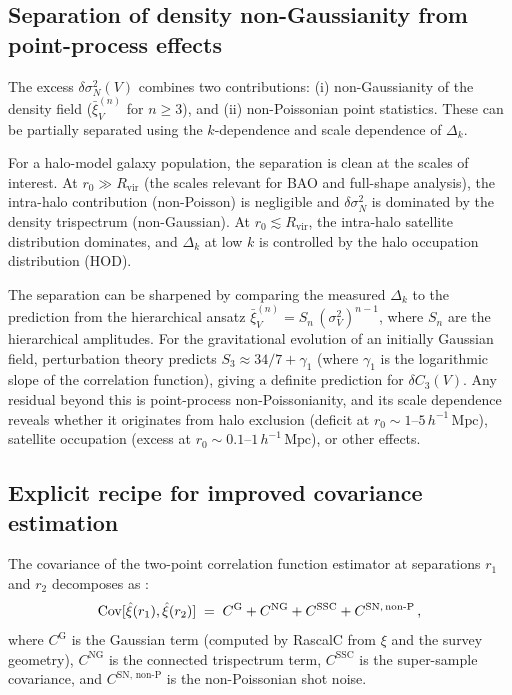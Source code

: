 \subsection{Separation of density non-Gaussianity from point-process effects}
\label{sec:separation}

The excess $\delta\sigma^2_N(V)$ combines two contributions: (i) non-Gaussianity of the density field ($\bar{\xi}^{(n)}_V$ for $n \geq 3$), and (ii) non-Poissonian point statistics.  These can be partially separated using the $k$-dependence and scale dependence of $\Delta_k$.

For a halo-model galaxy population, the separation is clean at the scales of interest.  At $r_0 \gg R_{\mathrm{vir}}$ (the scales relevant for BAO and full-shape analysis), the intra-halo contribution (non-Poisson) is negligible and $\delta\sigma^2_N$ is dominated by the density trispectrum (non-Gaussian).  At $r_0 \lesssim R_{\mathrm{vir}}$, the intra-halo satellite distribution dominates, and $\Delta_k$ at low $k$ is controlled by the halo occupation distribution (HOD).

The separation can be sharpened by comparing the measured $\Delta_k$ to the prediction from the hierarchical ansatz $\bar{\xi}^{(n)}_V = S_n\,(\sigma_V^2)^{n-1}$, where $S_n$ are the hierarchical amplitudes.  For the gravitational evolution of an initially Gaussian field, perturbation theory predicts $S_3 \approx 34/7 + \gamma_1$ (where $\gamma_1$ is the logarithmic slope of the correlation function), giving a definite prediction for $\delta C_3(V)$.  Any residual beyond this is point-process non-Poissonianity, and its scale dependence reveals whether it originates from halo exclusion (deficit at $r_0 \sim 1$--$5\,h^{-1}\,\mathrm{Mpc}$), satellite occupation (excess at $r_0 \sim 0.1$--$1\,h^{-1}\,\mathrm{Mpc}$), or other effects.

\subsection{Explicit recipe for improved covariance estimation}
\label{sec:cov_recipe}

The covariance of the two-point correlation function estimator at separations $r_1$ and $r_2$ decomposes as \citep{Philcox2020}:
\begin{equation}
  \mathrm{Cov}[\hat{\xi}(r_1), \hat{\xi}(r_2)] \;=\; C^{\mathrm{G}} + C^{\mathrm{NG}} + C^{\mathrm{SSC}} + C^{\mathrm{SN,\,non\text{-}P}}\,,
  \label{eq:cov_decomp}
\end{equation}
where $C^{\mathrm{G}}$ is the Gaussian term (computed by RascalC from $\xi$ and the survey geometry), $C^{\mathrm{NG}}$ is the connected trispectrum term, $C^{\mathrm{SSC}}$ is the super-sample covariance, and $C^{\mathrm{SN,\,non\text{-}P}}$ is the non-Poissonian shot noise.

